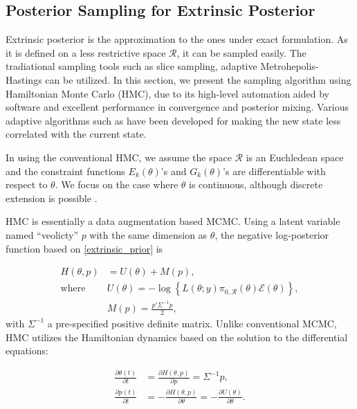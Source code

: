 \documentclass[10pt]{article}
\newcommand{\mc}[1]{\mathcal{#1}}
\begin{document}
\subsection{Posterior Sampling for Extrinsic Posterior}

Extrinsic posterior is the approximation to the ones under exact formulation. As it is defined on a less restrictive space $\mc R$, it can be sampled easily. The tradiational sampling tools such as slice sampling, adaptive Metrohepolis-Hastings can be utilized. In this section, we present the sampling algorithm using Hamiltonian Monte Carlo (HMC), due to its high-level automation aided by software and excellent performance in convergence and posterior mixing. Various adaptive algorithms such as \cite{hoffman2014no} have been developed for making the new state less correlated with the current state.

In using the conventional HMC, we assume the space $\mc R$ is an Euchledean space and the constraint functions $E_k(\theta)$'s and $G_k(\theta)$'s  are differentiable with respect to $\theta$. We focus on the case where $\theta$ is continuous, although discrete extension is possible \citep{zhang2012continuous}.

HMC is essentially a data augmentation based MCMC. Using a latent variable named ``veolicty'' $p$ with the same dimension as $\theta$, the negative log-posterior function based on \eqref{extrinsic_prior} is

\begin{equation}
\begin{aligned}
H(\theta, p)& = U(\theta)+M(p),\\
\text{where } & U(\theta) = -\log\left\{ L(\theta;y)\pi_{0,\mc R}(\theta) \mc{E}(\theta) \right\},\\
& M(p) = \frac{p'\Sigma^{-1} p}{2},\end{aligned}
\end{equation}
with $\Sigma^{-1}$ a pre-specified positive definite matrix. Unlike conventional MCMC, HMC utilizes the Hamiltonian dynamics based on the solution to the differential equations:

\begin{equation}
\begin{aligned}
\label{hamiltonian}
\frac{\partial \theta (t)}{\partial t} & =\frac{\partial H(\theta, p)}{\partial p} = \Sigma^{-1}p,\\
\frac{\partial p(t)}{\partial t}& =-\frac{\partial H(\theta, p)}{\partial \theta} = -\frac{\partial U(\theta)}{\partial \theta}.
\end{aligned}
\end{equation}
\end{document}
